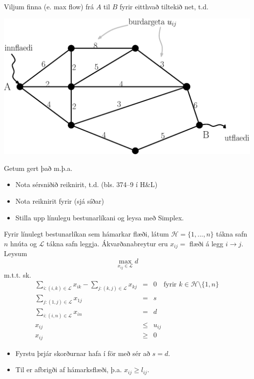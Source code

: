 Viljum finna  (e. max flow) frá $A$ til $B$ fyrir eitthvað tiltekið net, t.d.
\begin{center}
  \includegraphics[width=0.7\columnwidth]{figs/maxflow.eps}
\end{center}
Getum gert það m.þ.a.
\begin{itemize}
 \item Nota sérsniðið reiknirit, t.d.  (bls. 374--9 í H\&L)
 \item Nota reiknirit fyrir  (sjá síðar)
 \item Stilla upp línulegu bestunarlíkani og leysa með Simplex.
\end{itemize}
Fyrir línulegt bestunarlíkan sem hámarkar flæði, látum $\mathcal{H}=\{1,...,n\}$ tákna safn $n$ hnúta og $\mathcal{L}$ tákna safn leggja. Ákvarðanabreytur eru $x_{ij}=$ flæði á legg $i\to j$. Leysum 
$$ \max_{x_{ij}\in\mathcal{L}} d $$ 
m.t.t. sk.
\begin{eqnarray*}
\sum_{i:(i,k)\in\mathcal{L}} x_{ik} - \sum_{j:(k,j)\in\mathcal{L}} x_{kj} &=& 0 \quad \mbox{fyrir }k\in\mathcal{H}\setminus\{1,n\} \\ 
\sum_{j:(1,j)\in\mathcal{L}} x_{1j} &=& s \\ 
\sum_{i:(i,n)\in\mathcal{L}} x_{in} &=& d \\
x_{ij} &\leq& u_{ij} \\
x_{ij}&\geq&0 
\end{eqnarray*}

\begin{samepage}
\begin{aths}\begin{itemize}
\item Fyrstu þrjár skorðurnar hafa í för með sér að $s=d$.
\item Til er afbrigði af hámarksflæði, þ.a. $x_{ij}\geq l_{ij}$.
\end{itemize}
\end{aths}
\end{samepage}
